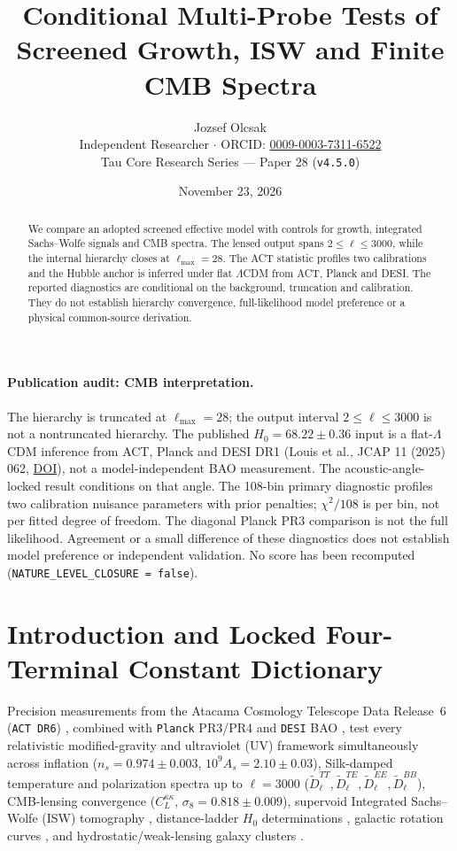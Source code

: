 \documentclass[11pt,a4paper]{article}
\title{Conditional Multi-Probe Tests of Screened Growth, ISW and Finite CMB Spectra}
\author{Jozsef Olcsak \\ \small Independent Researcher $\cdot$ ORCID: \href{https://orcid.org/0009-0003-7311-6522}{0009-0003-7311-6522} \\ \small Tau Core Research Series --- Paper 28 (\texttt{v4.5.0})}
\date{November 23, 2026}
\begin{document}
\maketitle

\begin{abstract}
We compare an adopted screened effective model with controls for growth, integrated Sachs--Wolfe signals and CMB spectra. The lensed output spans $2\le\ell\le3000$, while the internal hierarchy closes at $\ell_{\max}=28$. The ACT statistic profiles two calibrations and the Hubble anchor is inferred under flat $\Lambda$CDM from ACT, Planck and DESI. The reported diagnostics are conditional on the background, truncation and calibration. They do not establish hierarchy convergence, full-likelihood model preference or a physical common-source derivation.
\end{abstract}

\paragraph{Publication audit: CMB interpretation.}
The hierarchy is truncated at $\ell_{\max}=28$; the output interval
$2\leq\ell\leq3000$ is not a nontruncated hierarchy. The published
$H_0=68.22\pm0.36$ input is a flat-$\Lambda$CDM inference from ACT, Planck
and DESI DR1 (Louis et al., JCAP 11 (2025) 062,
\href{https://doi.org/10.1088/1475-7516/2025/11/062}{DOI}),
not a model-independent BAO measurement. The acoustic-angle-locked result
conditions on that angle. The 108-bin primary diagnostic profiles two
calibration nuisance parameters with prior penalties;
$\chi^2/108$ is per bin, not per fitted degree of freedom.
The diagonal Planck PR3 comparison is not the full likelihood.
Agreement or a small difference of these diagnostics does not establish
model preference or independent validation. No score has been recomputed
(\texttt{NATURE\_LEVEL\_CLOSURE = false}).


\section{Introduction and Locked Four-Terminal Constant Dictionary}
\label{sec:intro}

Precision measurements from the Atacama Cosmology Telescope Data Release~6 ({\upshape\texttt{ACT DR6}}) \cite{ACTDR6_Louis2025,ACTDR6_Calabrese2025,ACTDR6_Qu2024}, combined with \texttt{Planck} PR3/PR4 \cite{Planck2018VI,Planck2018X,Carron2022PR4Lensing} and \texttt{DESI} BAO \cite{DESI2024VI}, test every relativistic modified-gravity and ultraviolet (UV) framework simultaneously across inflation ($n_s = 0.974 \pm 0.003$, $10^9 A_s = 2.10 \pm 0.03$), Silk-damped temperature and polarization spectra up to $\ell = 3000$ ($\tilde{D}_\ell^{TT}, \tilde{D}_\ell^{TE}, \tilde{D}_\ell^{EE}, \tilde{D}_\ell^{BB}$), CMB-lensing convergence ($C_L^{\kappa\kappa}$, $\sigma_8 = 0.818 \pm 0.009$), supervoid Integrated Sachs--Wolfe (ISW) tomography \cite{Kovacs2022DESY3}, distance-ladder $H_0$ determinations \cite{Riess2022SH0ES,Freedman2025CCHP}, galactic rotation curves \cite{Lelli2016SPARC}, and hydrostatic/weak-lensing galaxy clusters \cite{Eckert2019XCOP}.
\end{document}
